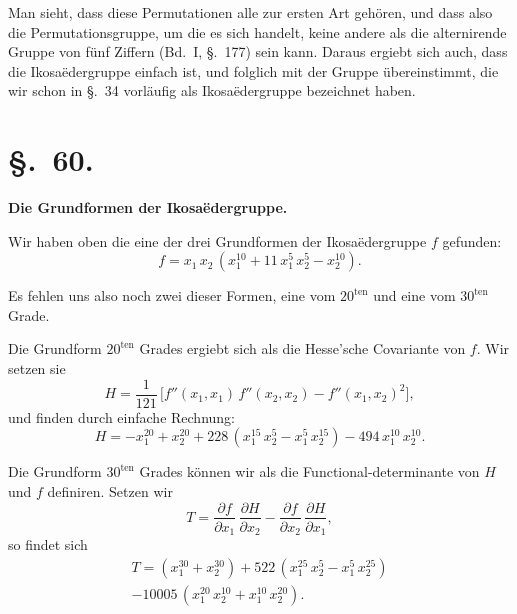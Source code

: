 \documentclass[12pt,a4paper]{article}
\newcommand{\sect}[1]{\section*{{\S.~#1.}}\addcontentsline{toc}{section}{\S.~#1}}
\begin{document}
Man sieht, dass diese Permutationen alle zur ersten Art gehören, und dass also die Permutationsgruppe, um die es sich handelt, keine andere als die alternirende Gruppe von fünf Ziffern (Bd.~I, \S.~177) sein kann. Daraus ergiebt sich auch, dass die Ikosaëdergruppe einfach ist, und folglich mit der Gruppe übereinstimmt, die wir schon in \S.~34 vorläufig als Ikosaëdergruppe bezeichnet haben.

\newpage
\sect{60}
\begin{center}
\textbf{Die Grundformen der Ikosaëdergruppe.}
\end{center}
\label{sec:60}

Wir haben oben die eine der drei Grundformen der Ikosaëdergruppe $f$ gefunden:
\begin{equation}\label{eq:60.1}
\tag{1}
f = x_{1}\,x_{2}\,(x_{1}^{10} + 11\,x_{1}^{5}\,x_{2}^{5} - x_{2}^{10}).
\end{equation}

Es fehlen uns also noch zwei dieser Formen, eine vom $20^{\text{ten}}$ und eine vom $30^{\text{ten}}$ Grade.

Die Grundform $20^{\text{ten}}$ Grades ergiebt sich als die Hesse'sche Covariante von $f$. Wir setzen sie
\begin{equation}\label{eq:60.2}
\tag{2}
H = \frac{1}{121}\,\bigl[f''(x_{1},x_{1})\,f''(x_{2},x_{2}) - f''(x_{1},x_{2})^{2}\bigr],
\end{equation}
und finden durch einfache Rechnung:
\begin{equation}\label{eq:60.3}
\tag{3}
H = -x_{1}^{20} + x_{2}^{20} + 228\,(x_{1}^{15}\,x_{2}^{5} - x_{1}^{5}\,x_{2}^{15}) - 494\,x_{1}^{10}\,x_{2}^{10}.
\end{equation}

Die Grundform $30^{\text{ten}}$ Grades können wir als die Functional-determinante von $H$ und $f$ definiren. Setzen wir
\begin{equation}\label{eq:60.4}
\tag{4}
T = \frac{\partial f}{\partial x_{1}}\,\frac{\partial H}{\partial x_{2}} - \frac{\partial f}{\partial x_{2}}\,\frac{\partial H}{\partial x_{1}},
\end{equation}
so findet sich
\begin{multline}\label{eq:60.5}
\tag{5}
T = (x_{1}^{30} + x_{2}^{30}) + 522\,(x_{1}^{25}\,x_{2}^{5} - x_{1}^{5}\,x_{2}^{25})\\
- 10005\,(x_{1}^{20}\,x_{2}^{10} + x_{1}^{10}\,x_{2}^{20}).
\end{multline}
\end{document}
